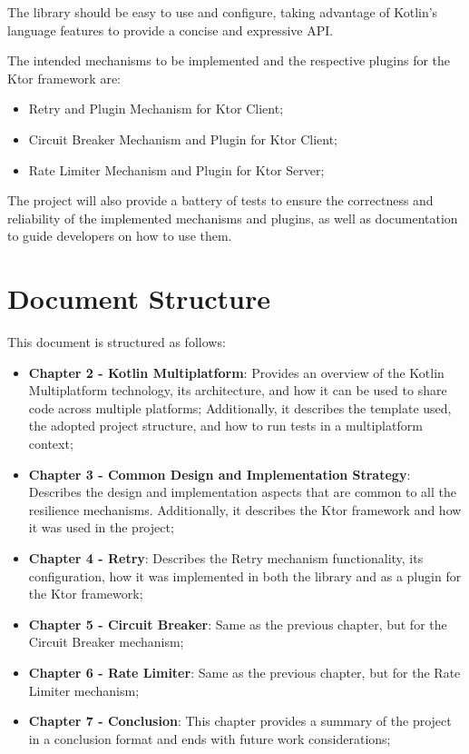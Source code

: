 The library should be easy to use and configure, taking advantage of Kotlin's language features to provide a concise and expressive API.

The intended mechanisms to be implemented and the respective plugins for the Ktor framework are:

\begin{itemize}
    \item Retry and Plugin Mechanism for Ktor Client;
    \item Circuit Breaker Mechanism and Plugin for Ktor Client;
    \item Rate Limiter Mechanism and Plugin for Ktor Server;
\end{itemize}

The project will also provide a battery of tests
to ensure the correctness and reliability of the implemented mechanisms and plugins,
as well as documentation to guide developers on how to use them.


\section{Document Structure}\label{sec:document-structure}

This document is structured as follows:

\begin{itemize}
    \item \textbf{Chapter 2 - Kotlin Multiplatform}: Provides an overview of the Kotlin Multiplatform technology, its architecture, and how it can be used to share code across multiple platforms; Additionally, it describes the template used, the adopted project structure, and how to run tests in a multiplatform context;
    \item \textbf{Chapter 3 - Common Design and Implementation Strategy}: Describes the design and implementation aspects that are common to all the resilience mechanisms.
    Additionally, it describes the Ktor framework and how it was used in the project;
    \item \textbf{Chapter 4 - Retry}: Describes the Retry mechanism functionality, its configuration, how it was implemented in both the library and as a plugin for the Ktor framework;
    \item \textbf{Chapter 5 - Circuit Breaker}: Same as the previous chapter, but for the Circuit Breaker mechanism;
    \item \textbf{Chapter 6 - Rate Limiter}: Same as the previous chapter, but for the Rate Limiter mechanism;
    \item \textbf{Chapter 7 - Conclusion}: This chapter provides a summary of the project in a conclusion format and ends with future work considerations;
\end{itemize}
